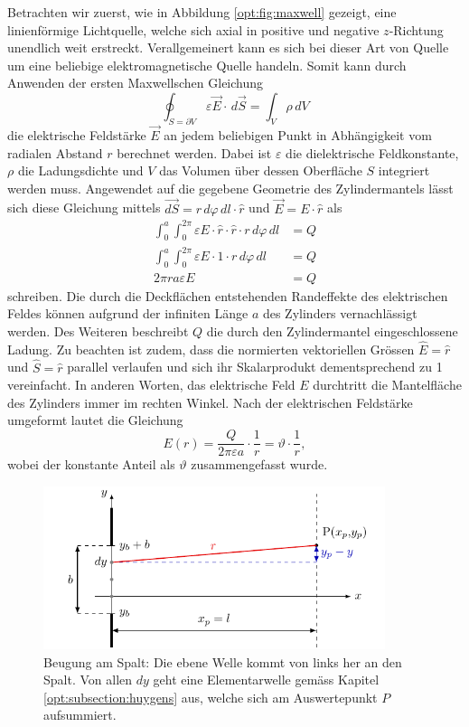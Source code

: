 Betrachten wir zuerst, wie in Abbildung \ref{opt:fig:maxwell} gezeigt, eine linienförmige Lichtquelle, welche sich axial in positive und negative $z$-Richtung unendlich weit erstreckt.
Verallgemeinert kann es sich bei dieser Art von Quelle um eine beliebige elektromagnetische Quelle handeln.
Somit kann durch Anwenden der ersten Maxwellschen Gleichung
\begin{equation*}
\oint_{S=\partial V} \varepsilon\vec{E} \cdot\, d\vec{S}
=
\int_{V}\rho\, dV
\end{equation*}
die elektrische Feldstärke $\vec{E}$ an jedem beliebigen Punkt in Abhängigkeit vom radialen Abstand $r$ berechnet werden.
Dabei ist $\varepsilon$ die dielektrische Feldkonstante, $\rho$ die Ladungsdichte und $V$ das Volumen über dessen Oberfläche $S$ integriert werden muss.
Angewendet auf die gegebene Geometrie des Zylindermantels lässt sich diese Gleichung mittels $\vec{dS} = r\, d\varphi\, dl \cdot \hat{r}$ und $\vec{E} = E \cdot \hat{r}$ als
\begin{align*}
\int_{0}^{a}\int_{0}^{2\pi} \varepsilon E\cdot \hat{r} \cdot \hat{r} \cdot r\, d\varphi\, dl
&=
Q
\\
\int_{0}^{a}\int_{0}^{2\pi} \varepsilon E\cdot 1 \cdot r\, d\varphi\, dl
&=
Q
\\
2\pi ra\varepsilon E
&=
Q
\end{align*}
schreiben.
Die durch die Deckflächen entstehenden Randeffekte des elektrischen Feldes können aufgrund der infiniten Länge $a$ des Zylinders vernachlässigt werden.
Des Weiteren beschreibt $Q$ die durch den Zylindermantel eingeschlossene Ladung.
Zu beachten ist zudem, dass die normierten vektoriellen Grössen $\hat{E} = \hat{r}$ und $\hat{S} = \hat{r}$ parallel verlaufen und sich ihr Skalarprodukt dementsprechend zu 1 vereinfacht.
In anderen Worten, das elektrische Feld $E$ durchtritt die Mantelfläche des Zylinders immer im rechten Winkel.
Nach der elektrischen Feldstärke umgeformt lautet die Gleichung
\begin{equation}
E(r)
=
\frac{Q}{2\pi\varepsilon a} \cdot \frac{1}{r}
=
\vartheta \cdot \frac{1}{r}
,
\label{opt:equation:electric_field}
\end{equation}
wobei der konstante Anteil als $\vartheta$ zusammengefasst wurde.

\begin{figure}
    \centering
    \includegraphics[width=100mm]{papers/opt/images/derivation.pdf}
    \caption{Beugung am Spalt: Die ebene Welle kommt von links her an den Spalt. 
    Von allen $dy$ geht eine Elementarwelle gemäss Kapitel \ref{opt:subsection:huygens} aus, welche sich am Auswertepunkt $P$ aufsummiert.}
    \label{opt:fig:geometricalShape}
\end{figure}

